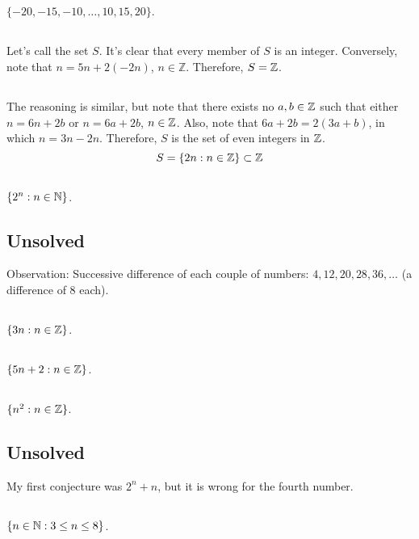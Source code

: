    \subsection{} $\{-20,-15,-10,\ldots,10,15,20\}$.
   \subsection{} Let's call the set $S$. It's clear that every member of $S$ is
   an integer. Conversely, note that $n=5n+2(-2n)$, $n \in \mathbb{Z}$. Therefore,
   $S=\mathbb{Z}$.
   \subsection{} The reasoning is similar, but note that there exists no $a,b \in \mathbb{Z}$
   such that either $n=6n+2b$ or $n=6a+2b$, $n \in \mathbb{Z}$. Also, note that
   $6a+2b=2(3a+b)$, in which $n=3n-2n$. Therefore, $S$ is the set of even integers in $\mathbb{Z}$.
   \begin{equation}
     S = \{2n: n \in \mathbb{Z}\} \subset \mathbb{Z}
   \end{equation}

   \subsection{} $\{2^n: n\in\mathbb{N}\}$.
   \subsection{Unsolved} Observation: Successive difference of each couple of
   numbers: $4, 12, 20, 28, 36,\ldots$ (a difference of 8 each).
   \subsection{} $\{3n: n \in \mathbb{Z}\}$.
   \subsection{} $\{5n+2: n \in \mathbb{Z}\}$.
   \subsection{} $\{n^2: n \in \mathbb{Z}\}$.
   \subsection{Unsolved}
   My first conjecture was $2^n + n$, but it is wrong for the fourth number.
   \subsection{} $\{n \in \mathbb{N}: 3 \leq n \leq 8\}$.
